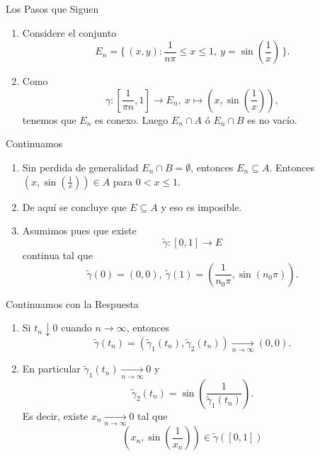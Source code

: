 \documentclass[utf8]{beamer}
\theoremstyle{plain}
\theoremstyle{definition}
\theoremstyle{remark}
\numberwithin{equation}{section}
\newcommand{\ga}{\gamma}                %
\newcommand{\bonj}[1]{\left\lbrack#1\right\rbrack}
\newcommand{\Set}[1]{\biggl\{\,#1\,\biggr\}} %
\renewcommand{\leq}{\leqslant}          %
\renewcommand{\.}{\Cdot}                %
\begin{document}
\begin{frame}{Los Pasos que Siguen}
  \begin{enumerate}
    \setcounter{enumi}{\value{saveenumi}}
    \item Considere el conjunto 
     $$E_n=\Set{(x,y):\frac{1}{n\pi}\leq x\leq 1,\ y=\sin\left(\frac{1}{x}\right)}.$$
    \item Como 
    $$\ga:\bonj{\frac{1}{\pi n},1}\to E_n,\ x\mapsto \left(x,\sin\left(\frac{1}{x}\right)\right),$$
    tenemos que $E_n$ es conexo. Luego $E_n\cap A$ ó $E_n\cap B$ es no vacío.
    \setcounter{saveenumi}{\value{enumi}}
    
  \end{enumerate}
  
\end{frame}

\begin{frame}{Continuamos}
  \begin{enumerate}
    \setcounter{enumi}{\value{saveenumi}}
    \item Sin perdida de generalidad $E_n\cap B =\emptyset$, entonces $E_n\subseteq A$. Entonces $\left(x,\sin\left(\frac{1}{x}\right)\right)\in A$ para $0<x\leq 1$.
    \item De aquí se concluye que $E\subseteq A$ y eso es imposible.
    \item Asumimos pues que existe 
     $$\tilde{\ga}:[0,1]\to E$$
     continua tal que 
     $$\tilde{\ga}(0)=(0,0),\ \tilde{\ga}(1)=\left(\frac{1}{n_0\pi},\sin(n_0\pi)\right).$$
     \setcounter{saveenumi}{\value{enumi}}
  \end{enumerate}
  
\end{frame}

\begin{frame}{Continuamos con la Respuesta}
  
  \begin{enumerate}
    \setcounter{enumi}{\value{saveenumi}}
    \item Si $t_n\downarrow 0$ cuando $n\to\infty$, entonces
     $$\tilde{\ga}(t_n)=(\tilde{\ga}_1(t_n),\tilde{\ga}_2(t_n))\xrightarrow[n\to\infty]{}(0,0).$$
     \item En particular $\tilde{\ga}_1(t_n)\xrightarrow[n\to\infty]{}0$ y 
     $$\tilde{\ga}_2(t_n)=\sin\left(\frac{1}{\tilde{\ga}_1(t_n)}\right).$$
     Es decir, existe $x_n\xrightarrow[n\to\infty]{}0$ tal que 
     $$\left(x_n,\sin\left(\frac{1}{x_n}\right)\right)\in\tilde{\ga}([0,1])$$
  \end{enumerate}
\end{frame}
\end{document}
